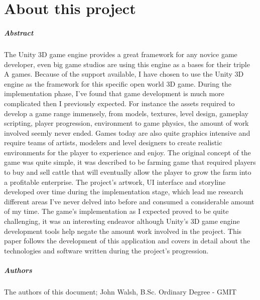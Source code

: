 
\chapter*{About this project}
\paragraph{Abstract}
The Unity 3D game engine provides a great framework for any novice game developer, even big game studios are using this engine as a bases for their triple A games. Because of the support available, I have chosen to use the Unity 3D engine as the framework for this specific open world 3D game. During the implementation phase, I've found that game development is much more complicated then I previously expected. For instance the assets required to develop a game range immensely, from models, textures, level design, gameplay scripting, player progression, environment to game physics, the amount of work involved seemly never ended. Games today are also quite graphics intensive and require teams of artists, modelers and level designers to create realistic environments for the player to experience and enjoy. 
The original concept of the game was quite simple, it was described to be farming game that required players to buy and sell cattle that will eventually allow the player to grow the farm into a profitable enterprise. The project's artwork, UI interface and storyline developed over time during the implementation stage, which lead me research different areas I've never delved into before and consumed a considerable amount of my time. The game's implementation as I expected proved to be quite challenging, it was an interesting endeavor although Unity's 3D game engine development tools help negate the amount work involved in the project. This paper follows the development of this application and covers in detail about the technologies and software written during the project's progression.

\paragraph{Authors}
The authors of this document; John Walsh, B.Sc. Ordinary Degree - GMIT

